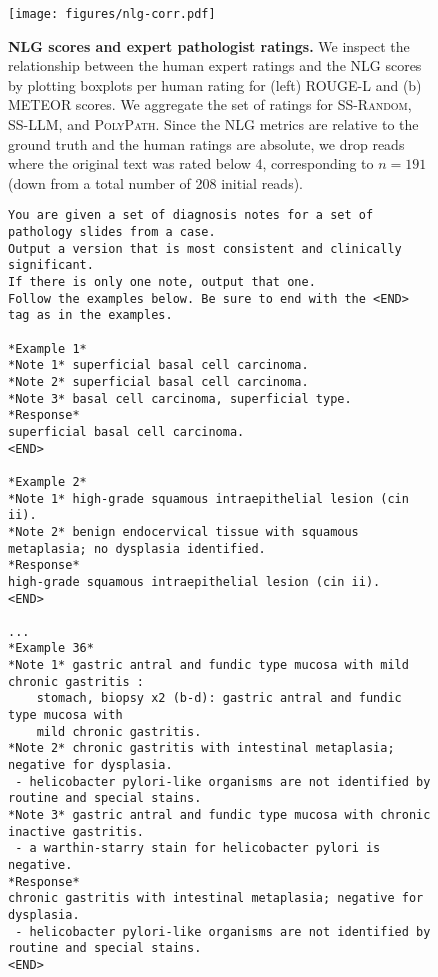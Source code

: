\documentclass[11pt]{article}
\newcommand{\ourmodel}{\textsc{PolyPath}\xspace}
\newcommand{\randommodel}{\textsc{SS-Random}\xspace}
\newcommand{\llmmodel}{\textsc{SS-LLM}\xspace}
\begin{document}
\begin{figure}[h]
\centering
\texttt{[image: figures/nlg-corr.pdf]}
\caption{\small \textbf{NLG scores and expert pathologist ratings.} We inspect the relationship between the human expert ratings and the NLG scores by plotting boxplots per human rating for (left) ROUGE-L and (b) METEOR scores. We aggregate the set of ratings for \randommodel, \llmmodel, and \ourmodel. Since the NLG metrics are relative to the ground truth and the human ratings are absolute, we drop reads where the original text was rated below 4, corresponding to $n = 191$ (down from a total number of 208 initial reads).}
\label{fig:nlgcorr}
\end{figure}


\begin{figure}[h]
\scriptsize
\begin{verbatim}
You are given a set of diagnosis notes for a set of pathology slides from a case.
Output a version that is most consistent and clinically significant.
If there is only one note, output that one.
Follow the examples below. Be sure to end with the <END> tag as in the examples.

*Example 1*
*Note 1* superficial basal cell carcinoma.
*Note 2* superficial basal cell carcinoma.
*Note 3* basal cell carcinoma, superficial type.
*Response*
superficial basal cell carcinoma.
<END>

*Example 2*
*Note 1* high-grade squamous intraepithelial lesion (cin ii).
*Note 2* benign endocervical tissue with squamous metaplasia; no dysplasia identified.
*Response*
high-grade squamous intraepithelial lesion (cin ii).
<END>

...
*Example 36*
*Note 1* gastric antral and fundic type mucosa with mild chronic gastritis :
    stomach, biopsy x2 (b-d): gastric antral and fundic type mucosa with 
    mild chronic gastritis.
*Note 2* chronic gastritis with intestinal metaplasia; negative for dysplasia.
 - helicobacter pylori-like organisms are not identified by routine and special stains.
*Note 3* gastric antral and fundic type mucosa with chronic inactive gastritis.
 - a warthin-starry stain for helicobacter pylori is negative.
*Response*
chronic gastritis with intestinal metaplasia; negative for dysplasia.
 - helicobacter pylori-like organisms are not identified by routine and special stains.
<END>


\end{verbatim}
\end{figure}
\end{document}

